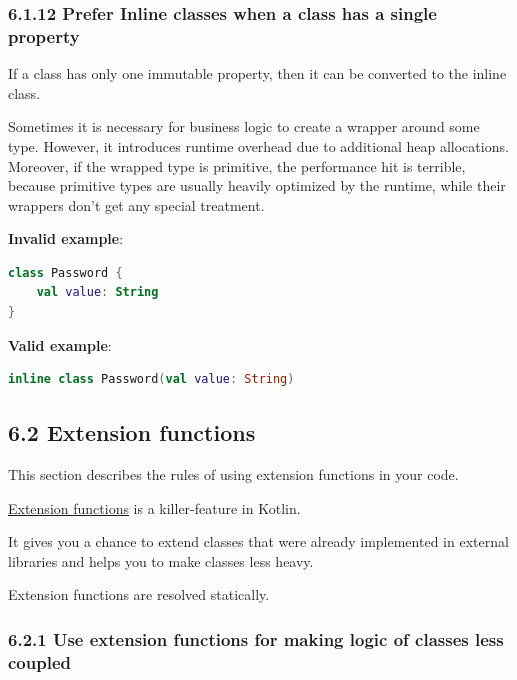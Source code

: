 \subsubsection*{\textbf{6.1.12 Prefer Inline classes when a class has a single property}}
\leavevmode\newline

\label{sec:6.1.12}

If a class has only one immutable property, then it can be converted to the inline class.



Sometimes it is necessary for business logic to create a wrapper around some type. However, it introduces runtime overhead due to additional heap allocations. Moreover, if the wrapped type is primitive, the performance hit is terrible, because primitive types are usually heavily optimized by the runtime, while their wrappers don't get any special treatment.



\textbf{Invalid example}:

\begin{lstlisting}[language=Kotlin]
class Password {
    val value: String
}
\end{lstlisting}


\textbf{Valid example}:

\begin{lstlisting}[language=Kotlin]
inline class Password(val value: String)
\end{lstlisting}


\subsection*{\textbf{6.2 Extension functions}}

\label{sec:6.2}

This section describes the rules of using extension functions in your code.



\href{https://kotlinlang.org/docs/reference/extensions.html}{Extension functions} is a killer-feature in Kotlin. 

It gives you a chance to extend classes that were already implemented in external libraries and helps you to make classes less heavy.

Extension functions are resolved statically.



\subsubsection*{\textbf{6.2.1 Use extension functions for making logic of classes less coupled}}
\leavevmode\newline

